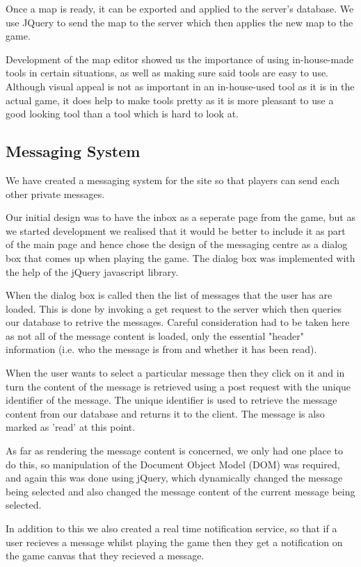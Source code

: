\documentclass[a4paper,11pt]{article}
\begin{document}
		Once a map is ready, it can be exported and applied to the server's database. We use JQuery to send the map to the server which then applies the new map to the game.

		Development of the map editor showed us the importance of using in-house-made tools in certain situations, as well as making sure said tools are easy to use. Although visual appeal is not as important in an in-house-used tool as it is in the actual game, it does help to make tools pretty as it is more pleasant to use a good looking tool than a tool which is hard to look at.
		
		\subsection{Messaging System}
		We have created a messaging system for the site so that players can send each other private messages.

		Our initial design was to have the inbox as a seperate page from the game, but as we started development we realised that it would be better to include it as part of the main page and hence chose the design of the messaging centre as a dialog box that comes up when playing the game.
		The dialog box was implemented with the help of the jQuery javascript library.

		When the dialog box is called then the list of messages that the user has are loaded. This is done by invoking a get request to the server which then queries our database to retrive the messages. Careful consideration had to be taken here as not all of the message content is loaded, only the essential "header" information (i.e. who the message is from and whether it has been read).

		When the user wants to select a particular message then they click on it and in turn the content of the message is retrieved using a post request with the unique identifier of the message. The unique identifier is used to retrieve the message content from our database and returns it to the client. The message is also marked as 'read' at this point.

		As far as rendering the message content is concerned, we only had one place to do this, so manipulation of the Document Object Model (DOM) was required, and again this was done using jQuery, which dynamically changed the message being selected and also changed the message content of the current message being selected.

		In addition to this we also created a real time notification service, so that if a user recieves a message whilst playing the game then they get a notification on the game canvas that they recieved a message.
		
\end{document}
